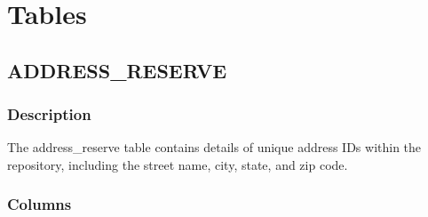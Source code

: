 \documentclass[
  letterpaper,
  DIV=11,
  numbers=noendperiod]{scrreprt}
\begin{document}
\part{Tables}

\hypertarget{address_reserve}{%
\chapter*{ADDRESS\_RESERVE}\label{address_reserve}}

\hypertarget{description}{%
\section*{Description}\label{description}}

The address\_reserve table contains details of unique address IDs within
the repository, including the street name, city, state, and zip code.

\hypertarget{columns}{%
\section*{Columns}\label{columns}}
\end{document}
